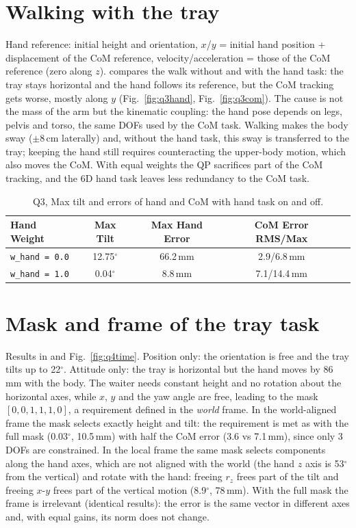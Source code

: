 \documentclass[10pt,a4paper]{article}
\newcommand{\fig}[1]{Fig.~\ref{fig:#1}}
\newcommand{\code}[1]{\texttt{#1}}
\begin{document}
\section{Walking with the tray}
Hand reference: initial height and orientation, $x$/$y$ = initial hand position + displacement of the CoM reference, velocity/acceleration = those of the CoM reference (zero along $z$).  compares the walk without and with the hand task: the tray stays horizontal and the hand follows its reference, but the CoM tracking gets worse, mostly along $y$ (\fig{q3hand}, \fig{q3com}). The cause is not the mass of the arm but the kinematic coupling: the hand pose depends on legs, pelvis and torso, the same DOFs used by the CoM task. Walking makes the body sway ($\pm8$\,cm laterally) and, without the hand task, this sway is transferred to the tray; keeping the hand still requires counteracting the upper-body motion, which also moves the CoM. With equal weights the QP sacrifices part of the CoM tracking, and the 6D hand task leaves less redundancy to the CoM task.

\begin{table}[H]
  \centering\small
  \begin{tabular}{lcccc}
    \toprule
    Hand Weight          & Max Tilt      & Max Hand Error & CoM Error RMS/Max \\
    \midrule
    \code{w\_hand = 0.0} & 12.75$^\circ$ & 66.2\,mm       & 2.9/6.8\,mm       \\
    \code{w\_hand = 1.0} & 0.04$^\circ$  & 8.8\,mm        & 7.1/14.4\,mm      \\
    \bottomrule
  \end{tabular}
  \caption{Q3, Max tilt and errors of hand and CoM with hand task on and off.}
  \label{table:Q3}
\end{table}

\section{Mask and frame of the tray task}

Results in  and \fig{q4time}. Position only: the orientation is free and the tray tilts up to 22$^\circ$. Attitude only: the tray is horizontal but the hand moves by 86\,mm with the body. The waiter needs constant height and no rotation about the horizontal axes, while $x$, $y$ and the yaw angle are free, leading to the mask $[0,0,1,1,1,0]$, a requirement defined in the \emph{world} frame. In the world-aligned frame the mask selects exactly height and tilt: the requirement is met as with the full mask (0.03$^\circ$, 10.5\,mm) with half the CoM error (3.6 vs 7.1\,mm), since only 3 DOFs are constrained. In the local frame the same mask selects components along the hand axes, which are not aligned with the world (the hand $z$ axis is 53$^\circ$ from the vertical) and rotate with the hand: freeing $r_z$ frees part of the tilt and freeing $x$-$y$ frees part of the vertical motion (8.9$^\circ$, 78\,mm). With the full mask the frame is irrelevant (identical results): the error is the same vector in different axes and, with equal gains, its norm does not change.
\end{document}
